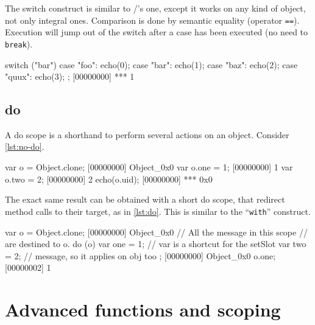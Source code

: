 \documentclass[openright,twoside,12pt]{report}
\begin{document}
The switch construct is similar to \C/\Cxx's one, except it works on
any kind of object, not only integral ones. Comparison is done by
semantic equality (operator \texttt{==}). Execution will jump out of
the switch after a case has been executed (no need to \texttt{break}).

\begin{urbiscript}[caption=The \texttt{switch} construct,
label=switch]
switch ("bar")
{
  case "foo":
    echo(0);
  case "bar":
    echo(1);
  case "baz":
    echo(2);
  case "quux":
    echo(3);
};
[00000000] *** 1
\end{urbiscript}

\section{do}
\label{section:constructs/do}

A do scope is a shorthand to perform several actions on an
object. Consider \autoref{lst:no-do}.

\begin{urbiscript}[caption=Lot of code bloat,label=lst:no-do]
var o = Object.clone;
[00000000] Object_0x0
var o.one = 1;
[00000000] 1
var o.two = 2;
[00000000] 2
echo(o.uid);
[00000000] *** 0x0
\end{urbiscript}

The exact same result can be obtained with a short do scope, that
redirect method calls to their target, as in \autoref{lst:do}. This is similar
to the \pascal ``\texttt{with}'' construct.


\begin{urbiscript}[caption=Shorter with a do block,label=lst:do]
var o = Object.clone;
[00000000] Object_0x0
// All the message in this scope
// are destined to o.
do (o)
{
 var one = 1; // var is a shortcut for the setSlot
 var two = 2; // message, so it applies on obj too
};
[00000000] Object_0x0
o.one;
[00000002] 1
\end{urbiscript}



\chapter{Advanced functions and scoping}
\end{document}
